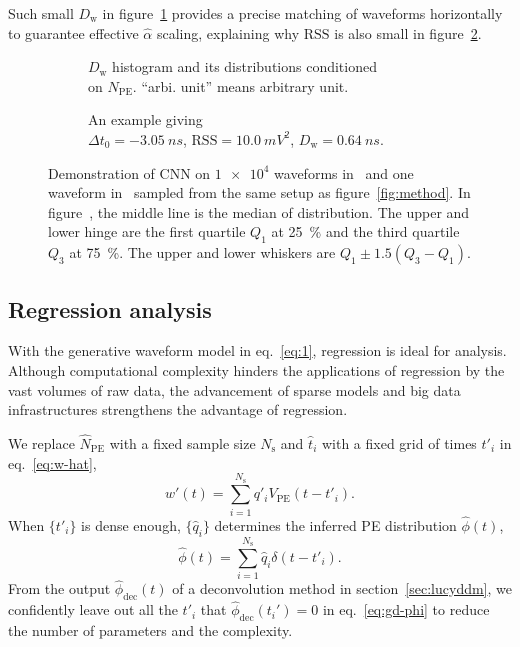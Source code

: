 Such small $D_\mathrm{w}$ in figure~\ref{fig:cnn-npe} provides a precise matching of waveforms horizontally to guarantee effective $\hat{\alpha}$ scaling, explaining why $\mathrm{RSS}$ is also small in figure~\ref{fig:cnn}.

\begin{figure}[H]
  \begin{subfigure}{.5\textwidth}
    \centering
    \resizebox{\textwidth}{!}{}
    \caption{\label{fig:cnn-npe} $D_\mathrm{w}$ histogram and its distributions conditioned \\ on $N_{\mathrm{PE}}$. ``arbi. unit'' means arbitrary unit.}
  \end{subfigure}
  \begin{subfigure}{.5\textwidth}
    \centering
    \resizebox{\textwidth}{!}{}
    \caption{\label{fig:cnn}An example giving \\ $\Delta t_0=\SI{-3.05}{ns}$, $\mathrm{RSS}=\SI{10.0}{mV^2}$, $D_\mathrm{w}=\SI{0.64}{ns}$.}
  \end{subfigure}
  \caption{\label{fig:cnn-performance}Demonstration of CNN on $\num[retain-unity-mantissa=false]{1e4}$ waveforms in~ and one waveform in~ sampled from the same setup as figure~\ref{fig:method}.  In figure~, the middle line is the median of distribution. The upper and lower hinge are the first quartile $Q_1$ at \SI{25}{\percent} and the third quartile $Q_3$ at \SI{75}{\percent}. The upper and lower whiskers are $Q_1 \pm 1.5(Q_3-Q_1)$. }
\end{figure}

\subsection{Regression analysis}
\label{sec:regression}
With the generative waveform model in eq.~\eqref{eq:1}, regression is ideal for analysis. Although computational complexity hinders the applications of regression by the vast volumes of raw data, the advancement of sparse models and big data infrastructures strengthens the advantage of regression.

We replace $\hat{N}_\mathrm{PE}$ with a fixed sample size $N_\mathrm{s}$ and $\hat{t}_i$ with a fixed grid of times $t'_i$ in eq.~\eqref{eq:w-hat}, 
\begin{equation}
  \label{eq:gd}
  w'(t) = \sum_{i=1}^{N_\mathrm{s}}q'_iV_\mathrm{PE}(t-t'_i).
\end{equation}
When $\{t'_i\}$ is dense enough, $\{\hat{q}_i\}$ determines the inferred PE distribution $\hat{\phi}(t)$,
\begin{equation}
  \label{eq:gd-phi}
  \hat{\phi}(t) = \sum_{i=1}^{N_\mathrm{s}}\hat{q}_i\delta(t-t'_i).
\end{equation}
From the output $\hat{\phi}_\mathrm{dec}(t)$ of a deconvolution method in section~\ref{sec:lucyddm}, we confidently leave out all the $t'_i$ that $\hat{\phi}_\mathrm{dec}(t_i')=0$ in eq.~\eqref{eq:gd-phi} to reduce the number of parameters and the complexity.


